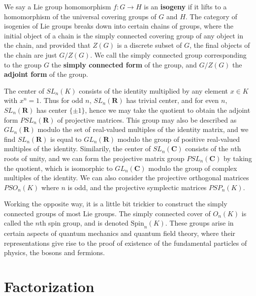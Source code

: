 We say a Lie group homomorphism $f: G \to H$ is an {\bf isogeny} if it lifts to a homomorphism of the universal covering groups of $G$ and $H$. The category of isogenies of Lie groups breaks down into certain chains of groups, where the initial object of a chain is the simply connected covering group of any object in the chain, and provided that $Z(G)$ is a discrete subset of $G$, the final objects of the chain are just $G/Z(G)$. We call the simply connected group corresponding to the group $G$ the {\bf simply connected form} of the group, and $G/Z(G)$ the {\bf adjoint form} of the group.

\begin{example}
    The center of $SL_n(K)$ consists of the identity multiplied by any element $x \in K$ with $x^n = 1$. Thus for odd $n$, $SL_n(\mathbf{R})$ has trivial center, and for even $n$, $SL_n(\mathbf{R})$ has center $\{ \pm 1 \}$, hence we may take the quotient to obtain the adjoint form $PSL_n(\mathbf{R})$ of projective matrices. This group may also be described as $GL_n(\mathbf{R})$ modulo the set of real-valued multiples of the identity matrix, and we find $SL_n(\mathbf{R})$ is equal to $GL_n(\mathbf{R})$ modulo the group of positive real-valued multiples of the identity. Similarily, the center of $SL_n(\mathbf{C})$ consists of the $n$th roots of unity, and we can form the projective matrix group $PSL_n(\mathbf{C})$ by taking the quotient, which is isomorphic to $GL_n(\mathbf{C})$ modulo the group of complex multiples of the identity. We can also consider the projective orthogonal matrices $PSO_n(K)$ where $n$ is odd, and the projective symplectic matrices $PSP_n(K)$.
\end{example}

Working the opposite way, it is a little bit trickier to construct the simply connected groups of most Lie groups. The simply connected cover of $O_n(K)$ is called the $n$th spin group, and is denoted $\text{Spin}_n(K)$. These groups arise in certain aspects of quantum mechanics and quantum field theory, where their representations give rise to the proof of existence of the fundamental particles of physics, the bosons and fermions.

\section{Factorization}

